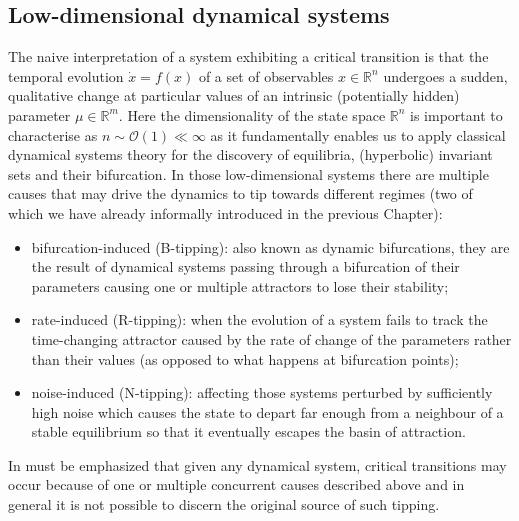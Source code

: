 \documentclass[../main.tex]{subfiles}
\begin{document}
\subsection{Low-dimensional dynamical systems}\label{subsec3.1}
The naive interpretation of a system exhibiting a critical transition is that the temporal evolution $\dot{x}=f(x)$ of a set of observables $x\in \mathbb{R}^{n}$ undergoes a sudden, qualitative change at particular values of an intrinsic (potentially hidden) parameter $\mu\in \mathbb{R}^{m}$. 
Here the dimensionality of the state space $\mathbb{R}^{n}$ is important to characterise as $n \sim \mathcal{O}(1)\ll\infty$ as it fundamentally enables us to apply classical dynamical systems theory for the discovery of equilibria, (hyperbolic) invariant sets and their bifurcation.
In those low-dimensional systems there are multiple causes that may drive the dynamics to tip towards different regimes (two of which we have already informally introduced in the previous Chapter):
\begin{itemize}
     \item bifurcation-induced (B-tipping): also known as dynamic bifurcations, they are the result of dynamical systems passing through a bifurcation of their parameters causing one or multiple attractors to lose their stability;
     \item rate-induced (R-tipping): when the evolution of a system fails to track the time-changing attractor caused by the rate of change of the parameters rather than their values (as opposed to what happens at bifurcation points);
     \item noise-induced (N-tipping): affecting those systems perturbed by sufficiently high noise which causes the state to depart far enough from a neighbour of a stable equilibrium so that it eventually escapes the basin of attraction.
\end{itemize}
In must be emphasized that given any dynamical system, critical transitions may occur because of one or multiple concurrent causes described above and in general it is not possible to discern the original source of such tipping.



\end{document}
